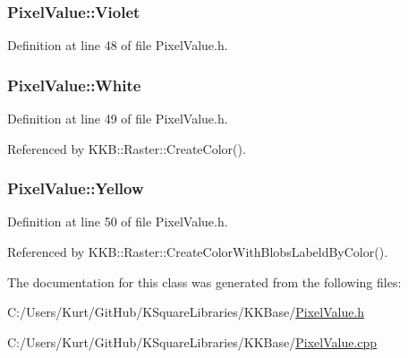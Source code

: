 \subsubsection[{\texorpdfstring{Violet}{Violet}}]{ Pixel\+Value\+::\+Violet\hspace{0.3cm}{\ttfamily [static]}}\hypertarget{class_k_k_b_1_1_pixel_value_accdb252cf7b2c1815901dd432f1e26c9}{}\label{class_k_k_b_1_1_pixel_value_accdb252cf7b2c1815901dd432f1e26c9}


Definition at line 48 of file Pixel\+Value.\+h.

\subsubsection[{\texorpdfstring{White}{White}}]{ Pixel\+Value\+::\+White\hspace{0.3cm}{\ttfamily [static]}}\hypertarget{class_k_k_b_1_1_pixel_value_acc6b911dd3a96eb1dc6eb0baf42047ed}{}\label{class_k_k_b_1_1_pixel_value_acc6b911dd3a96eb1dc6eb0baf42047ed}


Definition at line 49 of file Pixel\+Value.\+h.



Referenced by K\+K\+B\+::\+Raster\+::\+Create\+Color().

\subsubsection[{\texorpdfstring{Yellow}{Yellow}}]{ Pixel\+Value\+::\+Yellow\hspace{0.3cm}{\ttfamily [static]}}\hypertarget{class_k_k_b_1_1_pixel_value_a27b4eed1835edf9ed4dd82b1d81319ef}{}\label{class_k_k_b_1_1_pixel_value_a27b4eed1835edf9ed4dd82b1d81319ef}


Definition at line 50 of file Pixel\+Value.\+h.



Referenced by K\+K\+B\+::\+Raster\+::\+Create\+Color\+With\+Blobs\+Labeld\+By\+Color().



The documentation for this class was generated from the following files\+:\begin{DoxyCompactItemize}
\item 
C\+:/\+Users/\+Kurt/\+Git\+Hub/\+K\+Square\+Libraries/\+K\+K\+Base/\hyperlink{_pixel_value_8h}{Pixel\+Value.\+h}\item 
C\+:/\+Users/\+Kurt/\+Git\+Hub/\+K\+Square\+Libraries/\+K\+K\+Base/\hyperlink{_pixel_value_8cpp}{Pixel\+Value.\+cpp}\end{DoxyCompactItemize}
